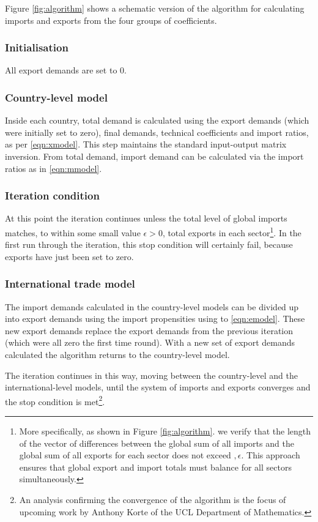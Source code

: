 \documentclass[a4paper]{article}
\begin{document}
Figure \ref{fig:algorithm} shows a schematic version of the algorithm for calculating imports and exports from the four groups of coefficients.
\subsubsection*{Initialisation}
All export demands are set to 0.

\subsubsection*{Country-level model}
Inside each country, total demand is calculated using the export demands (which were initially set to zero), final demands, technical coefficients and import ratios, as per \cref{eqn:xmodel}.
This step maintains the standard input-output matrix inversion.
From total demand, import demand can be calculated via the import ratios as in \cref{eqn:mmodel}.

\subsubsection*{Iteration condition}
At this point the iteration continues unless the total level of global imports matches, to within some small value $\epsilon > 0$, total exports in each sector\footnote{More specifically, as shown in Figure \ref{fig:algorithm}. we verify that the length of the vector of differences between the global sum of all imports and the global sum of all exports for each sector does not exceed $, \epsilon$. This approach ensures that global export and import totals must balance for all sectors simultaneously.}.
In the first run through the iteration, this stop condition will certainly fail, because exports have just been set to zero.

\subsubsection*{International trade model}
The import demands calculated in the country-level models can be divided up into export demands using the import propensities using to \cref{eqn:emodel}.
These new export demands replace the export demands from the previous iteration (which were all zero the first time round).
With a new set of export demands calculated the algorithm returns to the country-level model.

The iteration continues in this way, moving between the country-level and the international-level models, until the system of imports and exports converges and the stop condition is met\footnote{An analysis confirming the convergence of the algorithm is the focus of upcoming work by Anthony Korte of the UCL Department of Mathematics.}.
\end{document}
